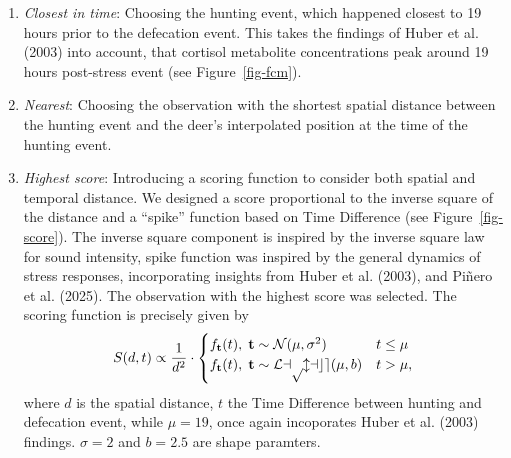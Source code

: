 \documentclass[
  letterpaper,
  DIV=11,
  numbers=noendperiod,
  twocolumn,
  open=any]{scrreprt}
\begin{document}
\begin{enumerate}
\def\labelenumi{\arabic{enumi}.}
\item
  \emph{Closest in time}: Choosing the hunting event, which happened
  closest to 19 hours prior to the defecation event. This takes the
  findings of Huber et al. (2003) into account, that cortisol metabolite
  concentrations peak around 19 hours post-stress event (see
  Figure~\ref{fig-fcm}).
\item
  \emph{Nearest}: Choosing the observation with the shortest spatial
  distance between the hunting event and the deer's interpolated
  position at the time of the hunting event.
\item
  \emph{Highest score}: Introducing a scoring function to consider both
  spatial and temporal distance. We designed a score proportional to the
  inverse square of the distance and a ``spike'' function based on Time
  Difference (see Figure~\ref{fig-score}). The inverse square component
  is inspired by the inverse square law for sound intensity, spike
  function was inspired by the general dynamics of stress responses,
  incorporating insights from Huber et al. (2003), and Piñero et al.
  (2025). The observation with the highest score was selected. The
  scoring function is precisely given by \begin{equation*}
    S(d, t) \propto \frac{1}{d^2} \cdot \begin{cases}
    f_\textbf{t}(t), \hspace{.1cm} \textbf{t} \sim \mathcal{N}(\mu, \sigma^2) &t \leq \mu \\
    f_\textbf{t}(t), \hspace{.1cm} \textbf{t} \sim \mathcal{Laplace}(\mu, b) &t > \mu,
    \end{cases}
  \end{equation*} where \(d\) is the spatial distance, \(t\) the Time
  Difference between hunting and defecation event, while \(\mu = 19\),
  once again incoporates Huber et al. (2003) findings. \(\sigma = 2\)
  and \(b = 2.5\) are shape paramters.
\end{enumerate}
\end{document}
